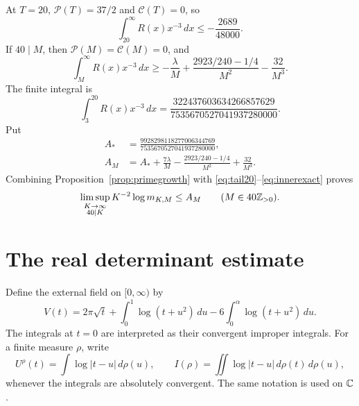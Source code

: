 At $T=20$, $\mathcal P(T)=37/2$ and $\mathcal C(T)=0$, so
\begin{equation}\label{eq:tail20}
 \int_{20}^\infty R(x)x^{-3}\,dx\le-\frac{2689}{48000}.
\end{equation}
If $40\mid M$, then $\mathcal P(M)=\mathcal C(M)=0$, and
\begin{equation}\label{eq:tailM}
 \int_M^\infty R(x)x^{-3}\,dx
 \ge-\frac\lambda M+\frac{2923/240-1/4}{M^2}-\frac{32}{M^3}.
\end{equation}
The finite integral is
\begin{equation}\label{eq:innerexact}
 \int_3^{20}R(x)x^{-3}\,dx
 =\frac{322437603634266857629}{7535670527041937280000}.
\end{equation}
Put
\begin{align}
 A_*&=\frac{9928298118277006344769}{7535670527041937280000},
 \label{eq:Astar}\\
 A_M&=A_*+\frac{7\lambda}{M}
              -\frac{2923/240-1/4}{M^2}+\frac{32}{M^3}.
 \label{eq:AM}
\end{align}
Combining Proposition~\ref{prop:primegrowth} with
\eqref{eq:tail20}--\eqref{eq:innerexact} proves
\begin{equation}\label{eq:AMbound}
 \limsup_{\substack{K\to\infty\\40\mid K}}K^{-2}\log m_{K,M}\le A_M
 \qquad(M\in40\mathbb Z_{>0}).
\end{equation}

\section{The real determinant estimate}
\label{sec:real}
Define the external field on $[0,\infty)$ by
\begin{equation}\label{eq:Vdef}
 V(t)=2\pi\sqrt t+\int_0^1\log(t+u^2)\,du
                         -6\int_0^\alpha\log(t+u^2)\,du.
\end{equation}
The integrals at $t=0$ are interpreted as their convergent improper
integrals. For a finite measure $\rho$, write
\[
 U^\rho(t)=\int\log|t-u|\,d\rho(u),\qquad
 I(\rho)=\iint\log|t-u|\,d\rho(t)\,d\rho(u),
\]
whenever the integrals are absolutely convergent. The same notation is
used on $\mathbb C$.

